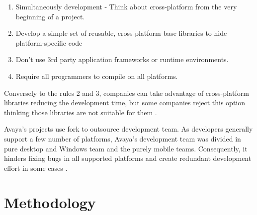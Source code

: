 \documentclass[10pt, conference]{IEEEtran}
\begin{document}
\begin{enumerate}
\item Simultaneously development - Think about cross-platform from the very beginning of a project.  
\item Develop a simple set of reusable, cross-platform base libraries to hide platform-specific code
\item Don’t use 3rd party application frameworks or runtime environments. 
\item Require all programmers to compile on all platforms.
\end{enumerate}

Conversely to the rules 2 and 3, companies can take advantage of cross-platform libraries reducing the development time, but some companies reject this option thinking those libraries are not suitable for them \cite{Fahy2012}.

Avaya's projects use fork to outsource development team. As developers generally support a few number of platforms, Avaya's development team  was divided in pure desktop and Windows team and the purely mobile teams. Consequently, it hinders fixing bugs  in all supported platforms and create redundant development effort in some cases \cite{Duc2014}.  



\section{Methodology}
\label{methodology}
\end{document}
